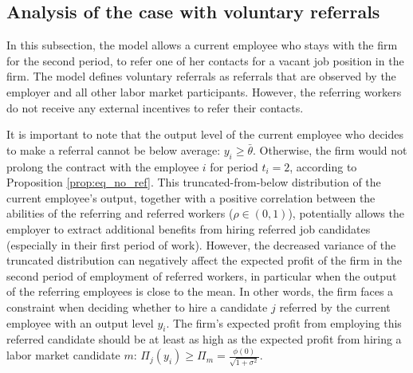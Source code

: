 \documentclass[12pt]{article}
\begin{document}
\subsection{Analysis of the case with voluntary referrals}

In this subsection, the model allows a current employee who stays with the firm for the second period, to refer one of her contacts for a vacant job position in the firm. The model defines voluntary referrals as referrals that are observed by the employer and all other labor market participants. However, the referring workers do not receive any external incentives to refer their contacts.

It is important to note that the output level of the current employee who decides to make a referral cannot be below average: $y_i \geq \bar{\theta}$. Otherwise, the firm would not prolong the contract with the employee $i$ for period $t_i = 2$, according to Proposition \ref{prop:eq_no_ref}. This truncated-from-below distribution of the current employee's output, together with a positive correlation between the abilities of the referring and referred workers ($\rho \in (0,1)$), potentially allows the employer to extract additional benefits from hiring referred job candidates (especially in their first period of work). However, the decreased variance of the truncated distribution can negatively affect the expected profit of the firm in the second period of employment of referred workers, in particular when the output of the referring employees is close to the mean. In other words, the firm faces a constraint when deciding whether to hire a candidate $j$ referred by the current employee with an output level $y_i$. The firm's expected profit from employing this referred candidate should be at least as high as the expected profit from hiring a labor market candidate $m$: $\Pi_j (y_i) \geq \Pi_m = \frac{\phi(0)}{\sqrt{1+\sigma^2}}$.
\end{document}
